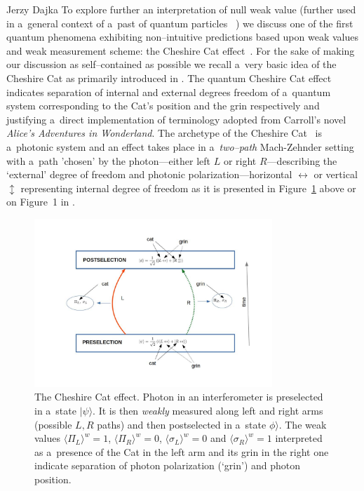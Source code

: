 \begin{artengenv}{Jerzy Dajka}
To explore further an interpretation of null weak value (further used in a~general context of a~past of quantum particles ~\parencite{PhysRevA.95.032110,PhysRevA.97.046102,PhysRevA.97.046103}) we discuss one of the first quantum phenomena exhibiting non--intuitive predictions based upon weak values and weak measurement scheme: the Cheshire Cat effect~\parencite{cat,cat_schlos}. For the sake of making our discussion as self--contained as possible we recall a~very basic idea of the  Cheshire Cat as primarily introduced in \parencite{cat}.   The quantum Cheshire Cat effect indicates  separation of internal and external degrees freedom of a~quantum system corresponding to the Cat's position and the grin respectively and justifying a~direct implementation of terminology adopted from Carroll's novel {\it Alice’s Adventures in Wonderland}. 
%
The archetype of the Cheshire Cat~\parencite{cat} is a~photonic system and an effect takes place in a~{\it two--path} Mach-Zehnder setting with a~path 'chosen' by  the photon---either left $L$ or right $R$---describing the `external' degree of freedom  and photonic polarization---horizontal $\leftrightarrow$ or vertical $\updownarrow$ representing internal degree of freedom as it is presented in Figure~\ref{cat} above or on Figure~1 in \parencite{cat}. 
\begin{figure}
 \begin{center}
 \includegraphics[width=0.8\textwidth]{ART_dajka/cat.jpg}%
 \end{center}%
 \caption{The Cheshire Cat effect. Photon in an interferometer is preselected in a~state $|\psi\rangle$.  It is then  {\it weakly} measured along left and right arms (possible $L,R$ paths)  and then postselected in a~state $\phi\rangle$. The weak values $
\langle \Pi_L\rangle^w =1$,
$\langle \Pi_R\rangle^w=0$, 
$\langle \sigma_L\rangle^w =0$ and $\langle \sigma_R\rangle^w=1$ interpreted as a~presence of the Cat in the left arm and its grin in the right one indicate separation of photon polarization (`grin') and photon position. }\label{cat}

\end{figure}
\end{artengenv}

